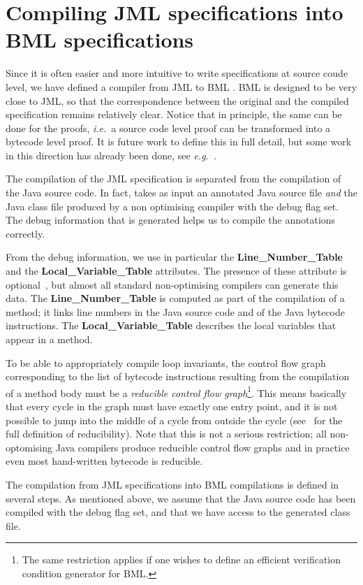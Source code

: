 
\section{Compiling JML specifications into BML specifications}
Since it is often easier and more intuitive to write specifications at
source coude level, we have defined a compiler from JML to BML
\JMLtoBML. BML is designed to be very close to JML, so that the
correspondence between the original and the compiled specification
remains relatively clear. Notice that in principle, the same can be
done for the proofs,
\emph{i.e.}\ a source code level proof can be transformed into a
bytecode level proof. It is future work to define this in full detail,
but some work in this direction has already been done, see
\emph{e.g.}~\cite{BartheRS05}. 

The compilation of the JML specification is separated from the
compilation of the Java source code. In fact, \JMLtoBML takes as input
an annotated Java source file \emph{and} the Java class file produced
by a non optimising compiler with the debug flag set. The debug
information that is generated helps us to compile the annotations
correctly. 

From the debug information, we use in particular the
\textbf{Line\_Number\_Table} and the \textbf{Local\_Variable\_Table}
attributes. The presence of these attribute is
optional~\cite{JVMspec}, but almost all standard non-optimising
compilers can generate this data. The \textbf{Line\_Number\_Table} is
computed as part of the compilation of a method; it links line numbers
in the Java source code and of the Java bytecode instructions.  The
\textbf{Local\_Variable\_Table} describes the local variables that
appear in a method.  

To be able to appropriately compile loop invariants, the control flow
graph corresponding to the list of bytecode instructions resulting
from the compilation of a method body must be a
\emph{reducible control flow graph}\footnote{The same restriction
applies if one wishes to define an efficient verification condition
generator for BML.}. This means basically that every cycle in the
graph must have exactly one entry point, and it is not possible to
jump into the middle of a cycle from outside the cycle
(see~\cite{AhoSU86} for the full definition of reducibility). Note
that this is not a serious restriction; all non-optomising Java
compilers produce reducible control flow graphs and in practice even
most hand-written bytecode is reducible.

The compilation from JML specifications into BML compilations is
defined in several steps. As mentioned above, we assume that the Java
source code has been compiled with the debug flag set, and that we
have access to the generated class file.

